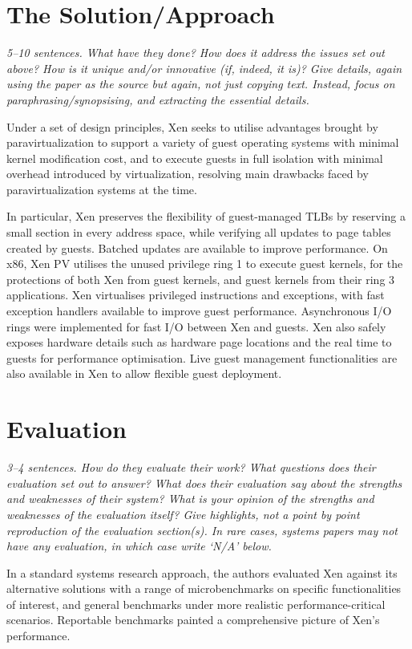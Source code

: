 \documentclass[11pt]{article}
\begin{document}
\section*{The Solution/Approach}
\textsl{5--10 sentences. What have they done? How does it address the issues set out above? How is it unique and/or innovative (if, indeed, it is)? Give details, again using the paper as the source but again, not just copying text. Instead, focus on paraphrasing/synopsising, and extracting the essential details.}

Under a set of design principles, Xen seeks to utilise advantages brought by paravirtualization to support a variety of guest operating systems with minimal kernel modification cost, and to execute guests in full isolation with minimal overhead introduced by virtualization, resolving main drawbacks faced by paravirtualization systems at the time.

In particular, Xen preserves the flexibility of guest-managed TLBs by reserving a small section in every address space, while verifying all updates to page tables created by guests. Batched updates are available to improve performance. On x86, Xen PV utilises the unused privilege ring 1 to execute guest kernels, for the protections of both Xen from guest kernels, and guest kernels from their ring 3 applications. Xen virtualises privileged instructions and exceptions, with fast exception handlers available to improve guest performance. Asynchronous I/O rings were implemented for fast I/O between Xen and guests. Xen also safely exposes hardware details such as hardware page locations and the real time to guests for performance optimisation. Live guest management functionalities are also available in Xen to allow flexible guest deployment.

\section*{Evaluation}
\textsl{3--4 sentences. How do they evaluate their work? What questions does their evaluation set out to answer? What does their evaluation say about the strengths and weaknesses of their system? What is your opinion of the strengths and weaknesses of the evaluation itself?  Give highlights, not a point by point reproduction of the evaluation section(s). In rare cases, systems papers may not have any evaluation, in which case write `N/A' below.}

In a standard systems research approach, the authors evaluated Xen against its alternative solutions with a range of microbenchmarks on specific functionalities of interest, and general benchmarks under more realistic performance-critical scenarios. Reportable benchmarks painted a comprehensive picture of Xen's performance.
\end{document}
